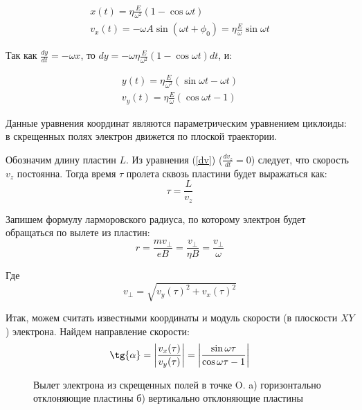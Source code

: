 \begin{gather}
	\label{eq:x_t}
	x(t)=\eta\frac{E}{\omega^2}(1-\cos{\omega{t}})\\
	v_x(t)=-\omega{A}\sin{(\omega{t}+\phi_0)}=\eta\frac{E}{\omega}\sin{\omega{t}}
\end{gather}

Так как $\frac{dy}{dt}=-\omega{x}$, то $dy=-\omega\eta\frac{E}{\omega^2}(1-\cos{\omega{t}}){dt}$, и:

\begin{gather}
	\label{eq:y_t}
	y(t)=\eta\frac{E}{\omega^2}(\sin{\omega{t}}-\omega{t})\\
	v_y(t)=\eta\frac{E}{\omega}(\cos\omega{t}-1)
\end{gather}

Данные уравнения координат являются параметрическим уравнением циклоиды: в скрещенных полях электрон движется по плоской траектории.

Обозначим длину пластин $L$. Из уравнения (\ref{dv}) ($\frac{dv_z}{dt}=0$) следует, что скорость $v_z$ постоянна. Тогда время $\tau$ пролета сквозь пластини будет выражаться как:
\begin{equation}
	\tau=\frac{L}{v_z}
\end{equation}

Запишем формулу ларморовского радиуса, по которому электрон будет обращаться по вылете из пластин:
\begin{equation}
	r=\frac{mv_\perp}{eB}=\frac{v_\perp}{\eta{B}}=\frac{v_\perp}{\omega}
\end{equation}

Где 
\begin{equation}
	v_\perp=\sqrt{v_y(\tau)^2+v_x(\tau)^2}
\end{equation}

Итак, можем считать известными координаты и модуль скорости (в плоскости $XY$) электрона. 
Найдем направление скорости:
\begin{equation}
	\label{eq:tg_a}
	\tg{\alpha}=\left|\frac{v_x(\tau)}{v_y(\tau)}\right|=\left|\frac{\sin{\omega{\tau}}}{\cos\omega{\tau}-1}\right|
\end{equation}



\begin{figure}[h!]
\centering
\begin{minipage}[h!]{0.49\linewidth}
\end{minipage}
\hfill
\begin{minipage}[h!]{0.49\linewidth}
\end{minipage}
\centering
\caption{Вылет электрона из скрещенных полей в точке O. a) горизонтально отклоняющие пластины б) вертикально отклоняющие пластины}
\label{ris:vert_hor}
\end{figure}



